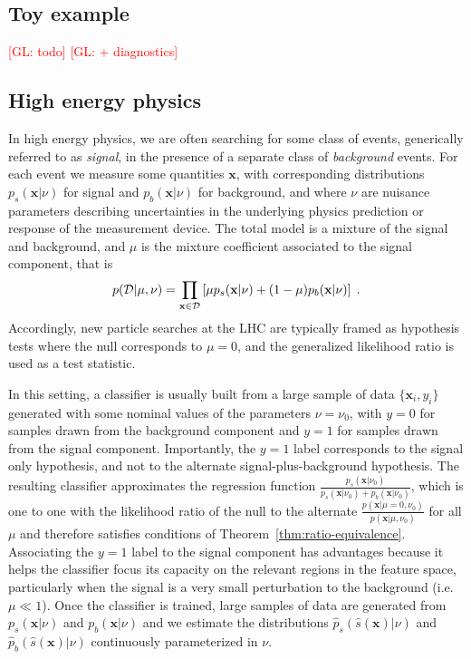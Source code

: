\documentclass[12pt]{article}
\numberwithin{equation}{section}
\theoremstyle{plain}
\newcommand{\glnote}[1]{\textcolor{red}{[GL: #1]}}
\begin{document}
\subsection{Toy example}

\glnote{todo}
\glnote{+ diagnostics}

\subsection{High energy physics}

In high energy physics, we are often searching for some class of events,
generically referred to as \textit{signal}, in the presence of a separate class
of \textit{background} events.  For each event we measure some quantities
$\mathbf{x}$, with corresponding distributions $p_s(\mathbf{x}|\nu)$ for signal
and $p_b(\mathbf{x}|\nu)$ for background, and where $\nu$ are nuisance
parameters describing uncertainties in the underlying physics prediction or
response of the measurement device. The total model is a mixture of the signal
and background, and $\mu$ is the mixture coefficient associated to the signal
component, that is
\begin{equation}\label{eq:hepGen}
p( {\cal D} | \mu, \nu) = \prod_{\mathbf{x} \in {\cal D}} \left[ \mu p_s( \mathbf{x} |  \nu)  + (1-\mu) p_b( \mathbf{x} | \nu) \right] \;.
\end{equation}
Accordingly, new particle searches at the LHC are typically framed as
hypothesis tests where the null corresponds to $\mu=0$, and the generalized
likelihood ratio is used as a test statistic.

In this setting, a classifier is usually built from a large sample of data
$\{\mathbf{x}_i, y_i\}$ generated with some nominal values of the parameters
$\nu=\nu_0$, with $y=0$ for samples drawn from the background component and
$y=1$ for samples drawn from the signal component. Importantly, the $y=1$ label
corresponds to the signal only hypothesis, and not to the alternate
signal-plus-background hypothesis. The resulting classifier approximates the
regression function
$\frac{p_s(\mathbf{x}|\nu_0)}{p_s(\mathbf{x}|\nu_0)+p_b(\mathbf{x}|\nu_0)}$, which is
one to one with the likelihood ratio of the null to the alternate
$\frac{p(\mathbf{x}|\mu=0,\nu_0)}{p(\mathbf{x}|\mu,\nu_0)}$ for all $\mu$ and therefore
satisfies conditions of Theorem~\ref{thm:ratio-equivalence}. Associating the
$y=1$ label to the signal component has advantages because it helps the
classifier focus its capacity on the relevant regions in the feature space,
particularly when the signal is a very small perturbation to the background
(i.e. $\mu \ll 1$). Once the classifier is trained, large samples of data are
generated from $p_s(\mathbf{x} | \nu)$ and $p_b(\mathbf{x} | \nu)$ and we
estimate the distributions $\hat{p}_s(\hat s(\mathbf{x}) | \nu)$ and
$\hat{p}_b(\hat s(\mathbf{x}) | \nu)$ continuously parameterized in $\nu$.
\end{document}
